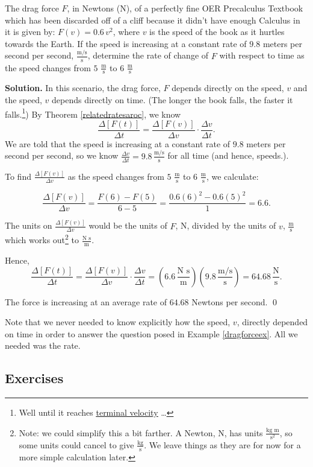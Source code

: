 \documentclass{ximera}
\begin{document}
\begin{ex}\label{dragforceex} The drag force $F$, in Newtons (N), of a perfectly fine OER Precalculus Textbook which has been discarded off of a cliff because it didn't have enough Calculus in it is given by:  $F(v) = 0.6 \, v^2$, where $v$ is the speed of the book as it hurtles towards the Earth. If the speed is increasing at a constant rate of $9.8$ meters per second per second, $\frac{\text{m/s}}{\text{s}}$, determine the rate of change of $F$ with respect to time as the speed changes from $5$ $\frac{\text{m}}{\text{s}}$ to $6$ $\frac{\text{m}}{\text{s}}$

\medskip

{\bf Solution.} In this scenario, the drag force, $F$ depends directly on the speed, $v$ and the speed, $v$ depends directly on time.  (The longer the book falls, the faster it falls.\footnote{Well until it reaches \href{https://en.wikipedia.org/wiki/Terminal_velocity}{\underline{terminal velocity}} \ldots})  By Theorem \ref{relatedratesaroc}, we know \[ \dfrac{\Delta[F(t)]}{\Delta t} = \dfrac{\Delta[F(v)]}{\Delta v} \cdot \dfrac{\Delta v}{\Delta t}.\]
We are told that the speed is increasing at a constant rate of $9.8$ meters per second per second, so we know $\frac{\Delta v}{\Delta t} = 9.8 \, \frac{\text{m/s}}{\text{s}}$ for all time (and hence, speeds.).  

\medskip

To find $\frac{\Delta[F(v)]}{\Delta v}$ as the speed changes from $5$ $\frac{\text{m}}{\text{s}}$ to $6$ $\frac{\text{m}}{\text{s}}$, we calculate:

\[ \dfrac{\Delta[F(v)]}{\Delta v} = \dfrac{F(6) - F(5)}{6-5} = \dfrac{0.6 (6)^2 - 0.6 (5)^2}{1} = 6.6.\]

The units on $\frac{\Delta[F(v)]}{\Delta v}$ would be the units of $F$, N, divided by the units of $v$, $\frac{\text{m}}{\text{s}}$ which works out\footnote{Note:  we could simplify this a bit farther.  A Newton, N, has units $\frac{\text{kg m}}{\text{s}^2}$, so some units could cancel  to give   $\frac{\text{kg}}{\text{s}}$.  We leave things as they are for now for a more simple calculation later.} to $\frac{\text{N s}}{\text{m}}$.  
\medskip

Hence, \[ \dfrac{\Delta[F(t)]}{\Delta t} =  \dfrac{\Delta[F(v)]}{\Delta v} \cdot \dfrac{\Delta v}{\Delta t} = \left(6.6 \,  \frac{\text{N s}}{\text{m}} \right) \left( 9.8  \, \frac{\text{m/s}}{\text{s}} \right) = 64.68 \, \frac{\text{N}}{\text{s}} .\]

The force is increasing at an average rate of $64.68$ Newtons per second.  \qed

\end{ex}

Note that we never needed to know explicitly how the speed, $v$, directly depended on time in order to answer the question posed in Example \ref{dragforceex}. All we needed was the rate.  

\newpage

\subsection{Exercises}


\closegraphsfile
\end{document}
